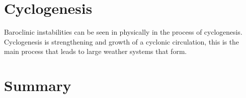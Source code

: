 \documentclass[a4paper,12pt]{article}
\begin{document}
\section{Cyclogenesis} 
Baroclinic instabilities can be seen in physically in the process of cyclogenesis. Cyclogenesis is strengthening and growth of a cyclonic circulation, this is the main process that leads to large weather systems that form. 
\section{Summary}
%
%
\printbibliography
\end{document}
